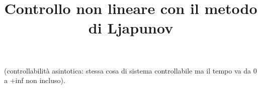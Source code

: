 \title{Controllo non lineare con il metodo di Ljapunov}

\maketitle
\label{sec:nonlinear-control}


(controllabilità asintotica: stessa cosa di sistema controllabile ma il tempo va da 0 a +inf non incluso).



